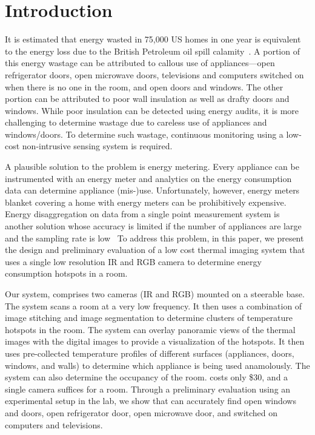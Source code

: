 \section{Introduction}
\label{sec:intro}

It is estimated that energy wasted in 75,000 US homes in one year
is equivalent to the energy loss due to the British Petroleum oil spill calamity~\cite{XX}. A portion of this energy wastage can
be attributed to callous use of appliances---open refrigerator doors,
open microwave doors, televisions and computers switched on when 
there is no one in the room, and open doors and windows. The other portion can be attributed to poor wall insulation as well as drafty doors and windows. While poor insulation can be detected using energy audits, it is more challenging to determine wastage due to careless use of appliances and
windows/doors. To determine such wastage, continuous monitoring using a low-cost non-intrusive sensing system is required.

A plausible solution to the problem is energy metering. Every appliance
can be instrumented with an energy meter and analytics on the energy
consumption data can determine appliance (mis-)use. Unfortunately, however,
energy meters blanket covering a home with energy meters can be prohibitively expensive. Energy disaggregation on data
from a single point measurement system is another solution 
whose accuracy is limited if the number of appliances are large and the sampling rate is low~\cite{XX} To address this problem, in this paper, we present the design and preliminary evaluation of a low cost thermal imaging system that uses a single low resolution IR and RGB camera to determine energy consumption hotspots in a room.

Our system, {\IRLeak} comprises two cameras (IR and RGB) mounted on a steerable base. The system scans a room at a very low frequency. It then uses a combination of image stitching and image segmentation to determine clusters of temperature hotspots in the room. The system can overlay panoramic views of the thermal images with the digital images to provide a visualization of the hotspots. It then uses pre-collected temperature profiles of different surfaces (appliances, doors, windows, and walls) to determine which appliance is being used anamolously. The system can also determine the occupancy of the room. {\IRLeak} costs only \$30, and a single camera suffices for a room. Through a preliminary evaluation using an experimental setup in the lab, we show that {\IRLeak} can accurately find open windows and doors, open refrigerator door, open microwave door, and switched on computers and televisions. 


